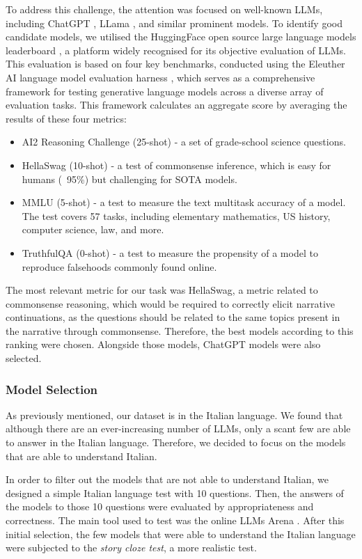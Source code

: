 To address this challenge, the attention was focused on well-known LLMs, including ChatGPT \cite{chatgpt}, LLama \cite{touvronllama}, and similar prominent models. To identify good candidate models, we utilised the HuggingFace open source large language models leaderboard \cite{huggingface-leaderboard}, a platform widely recognised for its objective evaluation of LLMs. This evaluation is based on four key benchmarks, conducted using the Eleuther AI language model evaluation harness \cite{eleuther}, which serves as a comprehensive framework for testing generative language models across a diverse array of evaluation tasks. This framework calculates an aggregate score by averaging the results of these four metrics:
\begin{itemize}
    \item {AI2 Reasoning Challenge (25-shot)} \cite{AI2} - a set of grade-school science questions.
    \item {HellaSwag (10-shot)} \cite{HellaSwag} - a test of commonsense inference, which is easy for humans (~95\%) but challenging for SOTA models.
    \item {MMLU (5-shot)} \cite{MMLU} - a test to measure the text multitask accuracy of a model. The test covers 57 tasks, including elementary mathematics, US history, computer science, law, and more.
    \item {TruthfulQA (0-shot)} \cite{Truthful} - a test to measure the propensity of a model to reproduce falsehoods commonly found online.
\end{itemize}
The most relevant metric for our task was HellaSwag, a metric related to commonsense reasoning, which would be required to correctly elicit narrative continuations, as the questions should be related to the same topics present in the narrative through commonsense. Therefore, the best models according to this ranking were chosen. Alongside those models, ChatGPT models were also selected. 

\subsubsection{Model Selection}
As previously mentioned, our dataset is in the Italian language. We found that although there are an ever-increasing number of LLMs, only a scant few are able to answer in the Italian language. Therefore, we decided to focus on the models that are able to understand Italian.

In order to filter out the models that are not able to understand Italian, we designed a simple Italian language test with 10 questions. Then, the answers of the models to those 10 questions were evaluated by appropriateness and correctness. The main tool used to test was the online LLMs Arena \cite{arena}. After this initial selection, the few models that were able to understand the Italian language were subjected to the \emph{story cloze test}, a more realistic test.

